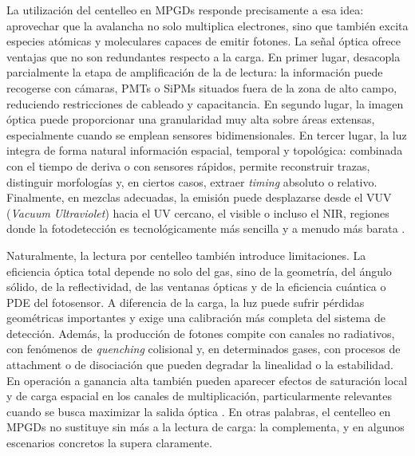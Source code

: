 \documentclass[12pt,a4paper]{article}
\begin{document}
La utilización del centelleo en MPGDs responde precisamente a esa idea: aprovechar que la avalancha no solo multiplica electrones, sino que también excita especies atómicas y moleculares capaces de emitir fotones. La señal óptica ofrece ventajas que no son redundantes respecto a la carga. En primer lugar, desacopla parcialmente la etapa de amplificación de la de lectura: la información puede recogerse con cámaras, PMTs o SiPMs situados fuera de la zona de alto campo, reduciendo restricciones de cableado y capacitancia. En segundo lugar, la imagen óptica puede proporcionar una granularidad muy alta sobre áreas extensas, especialmente cuando se emplean sensores bidimensionales. En tercer lugar, la luz integra de forma natural información espacial, temporal y topológica: combinada con el tiempo de deriva o con sensores rápidos, permite reconstruir trazas, distinguir morfologías y, en ciertos casos, extraer \emph{timing} absoluto o relativo. Finalmente, en mezclas adecuadas, la emisión puede desplazarse desde el VUV (\textit{Vacuum Ultraviolet}) hacia el UV cercano, el visible o incluso el NIR, regiones donde la fotodetección es tecnológicamente más sencilla y a menudo más barata \cite{bondara2010direct,morozov2012secondary,oliveira2012simulation,santorelli2021spectroscopic,bondar2012study}.

Naturalmente, la lectura por centelleo también introduce limitaciones. La eficiencia óptica total depende no solo del gas, sino de la geometría, del ángulo sólido, de la reflectividad, de las ventanas ópticas y de la eficiencia cuántica o PDE del fotosensor. A diferencia de la carga, la luz puede sufrir pérdidas geométricas importantes y exige una calibración más completa del sistema de detección. Además, la producción de fotones compite con canales no radiativos, con fenómenos de \emph{quenching} colisional y, en determinados gases, con procesos de attachment o de disociación que pueden degradar la linealidad o la estabilidad. En operación a ganancia alta también pueden aparecer efectos de saturación local y de carga espacial en los canales de multiplicación, particularmente relevantes cuando se busca maximizar la salida óptica \cite{christophorou1999electron,amedo2023observation}. En otras palabras, el centelleo en MPGDs no sustituye sin más a la lectura de carga: la complementa, y en algunos escenarios concretos la supera claramente.
\end{document}
